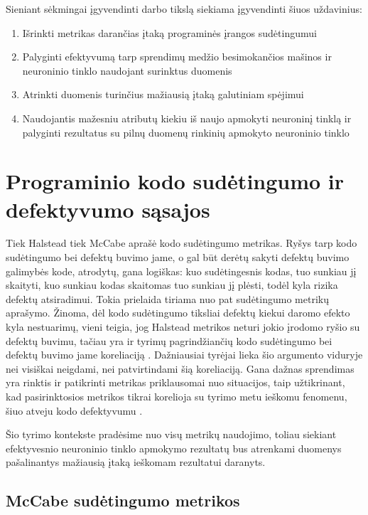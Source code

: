 \documentclass{VUMIFPSbakalaurinis}
\begin{document}
Sieniant sėkmingai įgyvendinti darbo tikslą siekiama įgyvendinti šiuos uždavinius:
\begin{enumerate}
\item Išrinkti metrikas darančias įtaką programinės įrangos sudėtingumui
\item Palyginti efektyvumą tarp sprendimų medžio besimokančios mašinos ir neuroninio tinklo naudojant surinktus duomenis
\item Atrinkti duomenis turinčius mažiausią įtaką galutiniam spėjimui
\item Naudojantis mažesniu atributų kiekiu iš naujo apmokyti neuroninį tinklą ir palyginti rezultatus su pilnų duomenų rinkinių apmokyto neuroninio tinklo
\end{enumerate}
 
\section{Programinio kodo sudėtingumo ir defektyvumo sąsajos}
Tiek Halstead tiek McCabe aprašė kodo sudėtingumo metrikas. Ryšys tarp kodo sudėtingumo bei defektų buvimo jame, o gal būt derėtų sakyti defektų buvimo galimybės kode, atrodytų, gana logiškas: kuo sudėtingesnis kodas, tuo sunkiau jį skaityti, kuo sunkiau kodas skaitomas tuo sunkiau jį plėsti, todėl kyla rizika defektų atsiradimui. Tokia prielaida tiriama nuo pat sudėtingumo metrikų aprašymo. Žinoma, dėl kodo sudėtingumo tiksliai defektų kiekui daromo efekto kyla nestuarimų, vieni teigia, jog Halstead metrikos neturi jokio įrodomo ryšio su defektų buvimu, tačiau yra ir tyrimų pagrindžiančių kodo sudėtingumo bei defektų buvimo jame koreliaciją \cite{Schroeder1999APG}. Dažniausiai tyrėjai lieka šio argumento viduryje nei visiškai neigdami, nei patvirtindami šią koreliaciją. Gana dažnas sprendimas yra rinktis ir patikrinti metrikas priklausomai nuo situacijos, taip užtikrinant, kad pasirinktosios metrikos tikrai korelioja su tyrimo metu ieškomu fenomenu, šiuo atveju kodo defektyvumu \cite{Metrics in Evaluating Software Defects:2013}.

Šio tyrimo kontekste pradėsime nuo visų metrikų naudojimo, toliau siekiant efektyvesnio neuroninio tinklo apmokymo rezultatų bus atrenkami duomenys pašalinantys mažiausią įtaką ieškomam rezultatui daranyts.

\subsection{McCabe sudėtingumo metrikos}
\end{document}
